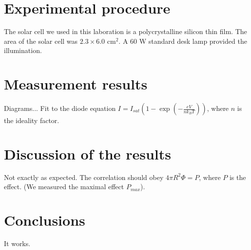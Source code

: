 \documentclass[a4paper]{article}
\begin{document}
\section{Experimental procedure}

The solar cell we used in this laboration is a polycrystalline silicon thin film. The area of the solar cell was $2.3 \times 6.0$ cm$^2$. A $60$ W standard desk lamp provided the illumination.

\section{Measurement results}

Diagrams... Fit to the diode equation $I = I_{sat}\left(1-\exp\left(-\frac{eV}{nk_BT}\right)\right)$, where $n$ is the ideality factor.

\section{Discussion of the results}

Not exactly as expected. The correlation should obey $4\pi R^2\Phi = P$, where $P$ is the effect. (We measured the maximal effect $P_{max}$).

\section{Conclusions}

It works.
\end{document}
